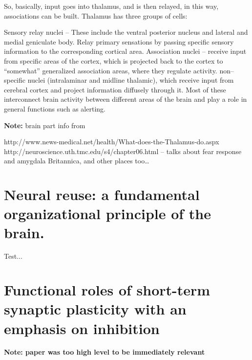 \documentclass[11pt, a4paper, oneside]{article}   	%
\begin{document}
So, basically, input goes into thalamus, and is then relayed, in this way, associations can be built. Thalamus has three groups of cells:
\begin{outline}
\point Sensory relay nuclei -- These include the ventral posterior nucleus and lateral and medial geniculate body. Relay primary sensations by passing specific sensory information to the corresponding cortical area. 
\point Association nuclei -- receive input from specific areas of the cortex, which is projected back to the cortex to ``somewhat'' generalized association areas, where they regulate activity.
\point non--specific nuclei (intralaminar and midline thalamic), which receive input from cerebral cortex and project information diffusely through it. Most of these interconnect brain activity between different areas of the brain and play a role in general functions such as alerting.
\end{outline}

\textbf{Note:} brain part info from

\begin{outline}
    \point http://www.news-medical.net/health/What-does-the-Thalamus-do.aspx
    \point http://neuroscience.uth.tmc.edu/s4/chapter06.html -- talks about fear response and amygdala
    \point Britannica, and other places too\ldots
\end{outline}





\section{Neural reuse: a fundamental organizational principle of the brain. \cite{Anderson2010}}

Test...

\section{Functional roles of short-term synaptic plasticity with an emphasis on inhibition \cite{Anwar2017}}


\textbf{Note: paper was too high level to be immediately relevant}
\end{document}
